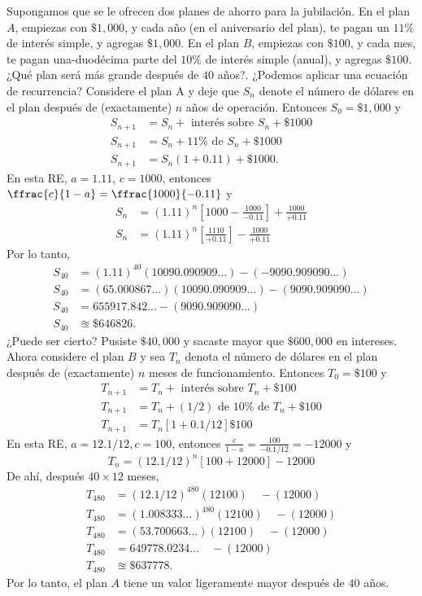 Supongamos que se le ofrecen dos planes de ahorro para la jubilación. En el plan $A$, empiezas con $\$1,000$, y cada año (en el aniversario del plan), te pagan un $11\%$ de interés simple, y agregas $\$1,000$. En el plan $B$, empiezas con $\$100$, y cada mes, te pagan una-duodécima parte del $10\%$ de interés simple (anual), y agregas $\$100$. ¿Qué plan será más grande después de $40$ años?. ¿Podemos aplicar una ecuación de recurrencia? Considere el plan A y deje que $S_{n}$ denote el número de dólares en el plan después de (exactamente) $n$ años de operación. Entonces $S_{0}=\$1,000$ y
\begin{align*}
	S_{n+1}&= S_{n}+\text{ interés sobre }S_n+\$1000\\
	S_{n+1}&=S_{n}+11\%\text{ de }S_n+\$1000\\
	S_{n+1}&=S_{n}(1+0.11)+\$1000.
\end{align*}
En esta RE, $a=1.11$, $c=1000$, entonces $\ffrac{c}{1-a}=\ffrac{1000}{-0.11}$ y
\begin{align*}
	S_{n}&={\left(1.11\right)}^{n}\left[1000-\frac{1000}{-0.11}\right]+\frac{1000}{+0.11}\\
	S_{n}&={\left(1.11\right)}^{n}\left[\frac{1110}{+0.11}\right]-\frac{1000}{+0.11}
\end{align*}
Por lo tanto,
\begin{align*}
	S_{40}&={\left(1.11\right)}^{40}(10090.090909\ldots)-(-9090.909090\ldots)\\
	S_{40}&=(65.000867\ldots)(10090.090909\ldots)-(9090.909090\ldots)\\
	S_{40}&=655917.842\ldots-(9090.909090\ldots)\\
	S_{40}&\approxeq\$646826.
\end{align*}
¿Puede ser cierto? Pusiste $\$40,000$ y sacaste mayor que $\$600,000$ en intereses. Ahora considere el plan $B$ y sea $T_{n}$ denota el número de dólares en el plan después de (exactamente) $n$ meses de funcionamiento. Entonces $T_{0}=\$100$ y
\begin{align*}
	T_{n+1}&=T_{n}+\text{ interés sobre }T_{n}+\$100\\
	T_{n+1}&= T_{n}+(1/2)\text{ de }10\%\text{ de }T_{n}+\$100\\
	T_{n+1}&=T_{n}\left[1+0.1/12\right]\$100
\end{align*}
En esta RE, $a=12.1/12,c=100$, entonces $\tfrac{c}{1-a}=\tfrac{100}{-0.1/12}=-12000$ y
\begin{equation*}
	T_{n}={\left(12.1/12\right)}^{n}\left[100+12000\right]-12000
\end{equation*}
De ahí, después $40\times12$ meses,
\begin{align*}
	T_{480}&={\left(12.1/12\right)}^{480}(12100)\quad-(12000)\\
	T_{480}&={\left(1.008333\ldots\right)}^{480}(12100)\quad-(12000)\\
	T_{480}&=\left(53.700663\ldots\right)(12100)\quad-(12000)\\
	T_{480}&=649778.0234\ldots \quad-(12000)\\
	T_{480}&\approxeq\$637778.
\end{align*}
Por lo tanto, el plan $A$ tiene un valor ligeramente mayor después de $40$ años.

